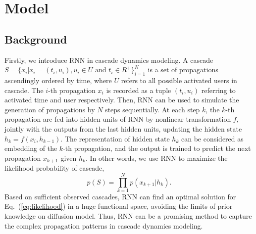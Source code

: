 \section{Model}

\subsection{Background}
Firstly, we introduce RNN 
in cascade dynamics modeling. A cascade $S=\{x_i|x_i=(t_i, u_i), u_i\in U
\text{~and~} t_i\in R^+\}_{i=1}^N$ is a set of propagations ascendingly ordered
by time, where $U$ refers to all possible activated users in cascade. The
$i$-th propagation $x_i$ is recorded as a tuple $(t_i, u_i)$ referring to
activated time and user respectively. Then, RNN can be used to simulate the
generation of propagations by $N$ steps sequentially. At each step $k$, the $k$-th
propagation are fed into hidden units of RNN by nonlinear transformation $f$,
jointly with the outputs from the last hidden units, updating the hidden state
$h_k=f(x_i,h_{k-1})$. The representation of hidden state $h_k$ can be considered
as embedding of the $k$-th propagation, and the output is
trained to predict the next propagation $x_{k+1}$ given $h_k$. In other words,
we use RNN to maximize the likelihood probability of cascade,
\begin{equation}
\label{eq:likelihood}
p(S)=\prod_{k=1}^N p(x_{k+1}|h_k).
\end{equation}
Based on sufficient observed cascades, RNN
can find an optimal solution for Eq.~(\ref{eq:likelihood})
in a huge functional space, avoiding the limits of prior knowledge on
diffusion model.
Thus, RNN can be a promising method to capture the complex propagation patterns in cascade
dynamics modeling. 

